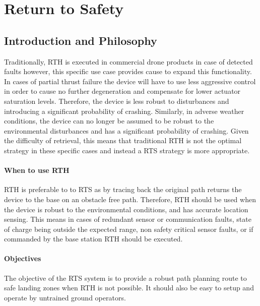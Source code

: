 \newpage
{}
\section{Return to Safety} \label{Return to Safety}

\subsection{Introduction and Philosophy}\label{sub_section:tgt_RTS_intro}
Traditionally, \gls{RTH} is executed in commercial drone products in case of detected faults however, this specific use case provides cause to expand this functionality. In cases of partial thrust failure the device will have to use less aggressive control in order to cause no further degeneration and compensate for lower actuator saturation levels. Therefore, the device is less robust to disturbances and introducing a significant probability of crashing. Similarly, in adverse weather conditions, the device can no longer be assumed to be robust to the environmental disturbances and has a significant probability of crashing. Given the difficulty of retrieval, this means that traditional \gls{RTH} is not the optimal strategy in these specific cases and instead a \gls{RTS} strategy is more appropriate.
\paragraph{When to use \gls{RTH}}
\gls{RTH} is preferable to to \gls{RTS} as by tracing back the original path returns the device to the base on an obstacle free path. Therefore, \gls{RTH} should be used when the device is robust to the environmental conditions, and  has accurate location sensing. This means in cases of redundant sensor or communication faults, state of charge being outside the expected range, non safety critical sensor faults, or if commanded by the base station \gls{RTH} should be executed.
\paragraph{Objectives}
The objective of the \gls{RTS} system is to provide a robust path planning route to safe landing zones when \gls{RTH} is not possible. It should also be easy to setup and operate by untrained ground operators.



